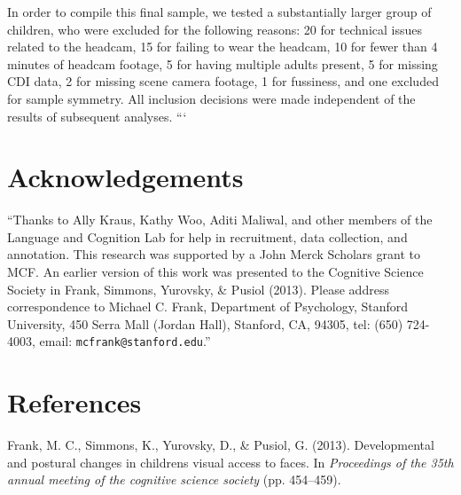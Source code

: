 \documentclass[10pt, letterpaper]{article}
\begin{document}
In order to compile this final sample, we tested a substantially larger
group of children, who were excluded for the following reasons: 20 for
technical issues related to the headcam, 15 for failing to wear the
headcam, 10 for fewer than 4 minutes of headcam footage, 5 for having
multiple adults present, 5 for missing CDI data, 2 for missing scene
camera footage, 1 for fussiness, and one excluded for sample symmetry.
All inclusion decisions were made independent of the results of
subsequent analyses. ```

\section{Acknowledgements}\label{acknowledgements}

``Thanks to Ally Kraus, Kathy Woo, Aditi Maliwal, and other members of
the Language and Cognition Lab for help in recruitment, data collection,
and annotation. This research was supported by a John Merck Scholars
grant to MCF. An earlier version of this work was presented to the
Cognitive Science Society in Frank, Simmons, Yurovsky, \& Pusiol (2013).
Please address correspondence to Michael C. Frank, Department of
Psychology, Stanford University, 450 Serra Mall (Jordan Hall), Stanford,
CA, 94305, tel: (650) 724-4003, email: \texttt{mcfrank@stanford.edu}.''

\section{References}\label{references}

\setlength{\parindent}{-0.1in} \setlength{\leftskip}{0.125in} \noindent

\hypertarget{refs}{}
\hypertarget{ref-frank2013}{}
Frank, M. C., Simmons, K., Yurovsky, D., \& Pusiol, G. (2013).
Developmental and postural changes in childrens visual access to faces.
In \emph{Proceedings of the 35th annual meeting of the cognitive science
society} (pp. 454--459).
\end{document}
